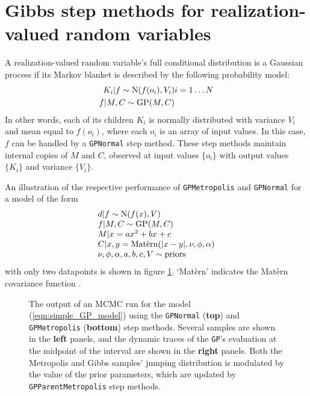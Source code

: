 \documentclass{report}
\begin{document}
\section{Gibbs step methods for realization-valued random variables}
A realization-valued random variable's full conditional distribution \cite{gilks} is a Gaussian process if its Markov blanket \cite{jensen} is described by the following probability model:
\begin{eqnarray*}
    K_i |f \sim \textup{N}(f(o_i), V_i) & i=1\ldots N\\
    f|M,C\sim\textup{GP}(M,C)
\end{eqnarray*}
In other words, each of its children $K_i$ is normally distributed with variance $V_i$ and mean equal to $f(o_i)$, where each $o_i$ is an array of input values. In this case, $f$ can be handled by a \texttt{GPNormal} step method. These step methods maintain internal copies of $M$ and $C$, observed at input values $\{o_i\}$ with output values $\{K_i\}$ and variance $\{V_i\}$. 

An illustration of the respective performance of \texttt{GPMetropolis} and \texttt{GPNormal} for a model of the form
\begin{equation}
    \label{eqn:simple_GP_model}
    \begin{array}{l}
        d|f \sim \textup{N}(f(x),V)\\
        f|M,C\sim \textup{GP}(M,C)\\
        M|x= ax^2+bx+c\\
        C|x,y= \textup{Mat\`ern}(|x-y|,\nu, \phi, \alpha)\\
        \nu,\phi,\alpha,a,b,c,V\sim \textup{priors}          
    \end{array}
\end{equation}
with only two datapoints is shown in figure \ref{fig:MCMCOutput}. `Mat\`ern' indicates the Mat\`ern covariance function \cite{Banerjee}. 

\begin{figure}
    \centering
    \caption{The output of an MCMC run for the model (\ref{eqn:simple_GP_model}) using the \texttt{GPNormal} (\textbf{top}) and \texttt{GPMetropolis} (\textbf{bottom}) step methods. Several samples are shown in the \textbf{left} panels, and the dynamic traces of the \texttt{GP}'s evaluation at the midpoint of the interval are shown in the \textbf{right} panels. Both the Metropolis and Gibbs samples' jumping distribution is modulated by the value of the prior parameters, which are updated by \texttt{GPParentMetropolis} step methods.}
    \label{fig:MCMCOutput}
\end{figure}
\end{document}
